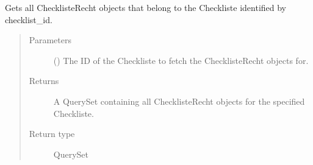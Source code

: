 \documentclass[letterpaper,10pt,english]{sphinxmanual}
\begin{document}
\begin{fulllineitems}
\label{\detokenize{masterCodeDoc:checklisten.templatetags.t_checklisten.get_perms.get_perms}}
Gets all ChecklisteRecht objects that belong to the Checkliste identified by checklist\_id.
\begin{quote}\begin{description}
\item[{Parameters}] \leavevmode
{} () \textendash{} The ID of the Checkliste to fetch the ChecklisteRecht objects for.

\item[{Returns}] \leavevmode
A QuerySet containing all ChecklisteRecht objects for the specified Checkliste.

\item[{Return type}] \leavevmode
QuerySet

\end{description}\end{quote}

\end{fulllineitems}

\label{\detokenize{masterCodeDoc:module-checklisten.templatetags.t_checklisten.get_tasks}}
\end{document}
